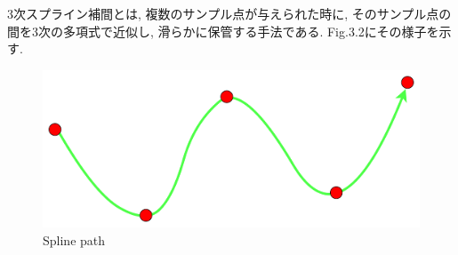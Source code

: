 3次スプライン補間とは, 複数のサンプル点が与えられた時に, そのサンプル点の間を3次の多項式で近似し, 滑らかに保管する手法である.
Fig.3.2にその様子を示す.

\begin{figure}[H]
     \centering
    \includegraphics[keepaspectratio, scale=0.5]
         {images/splinepath.png}
    \caption{Spline path}
    \label{fig:purepursuit}
\end{figure}


\newpage